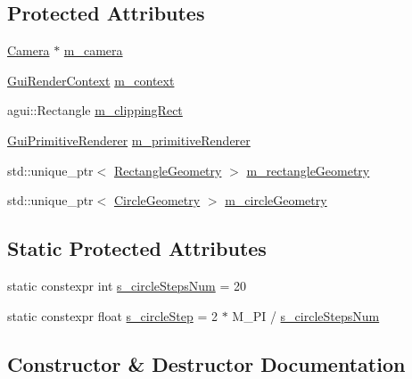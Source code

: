 \subsection*{Protected Attributes}
\begin{DoxyCompactItemize}
\item 
\mbox{\hyperlink{classec_1_1_camera}{Camera}} $\ast$ \mbox{\hyperlink{classec_1_1_open_g_l_graphics_a4d3a8b4a13012197802957a5465c6561}{m\+\_\+camera}}
\item 
\mbox{\hyperlink{structec_1_1_gui_render_context}{Gui\+Render\+Context}} \mbox{\hyperlink{classec_1_1_open_g_l_graphics_ab76d6c71e727a8a5127fae1071afe989}{m\+\_\+context}}
\item 
agui\+::\+Rectangle \mbox{\hyperlink{classec_1_1_open_g_l_graphics_aa45cbffad59139ce5f85404b755cc35f}{m\+\_\+clipping\+Rect}}
\item 
\mbox{\hyperlink{classec_1_1_gui_primitive_renderer}{Gui\+Primitive\+Renderer}} \mbox{\hyperlink{classec_1_1_open_g_l_graphics_af9728fbde00a35a87752c23e009e3864}{m\+\_\+primitive\+Renderer}}
\item 
std\+::unique\+\_\+ptr$<$ \mbox{\hyperlink{classec_1_1_rectangle_geometry}{Rectangle\+Geometry}} $>$ \mbox{\hyperlink{classec_1_1_open_g_l_graphics_a456769068c3eeca19ea08838c25d62a2}{m\+\_\+rectangle\+Geometry}}
\item 
std\+::unique\+\_\+ptr$<$ \mbox{\hyperlink{classec_1_1_circle_geometry}{Circle\+Geometry}} $>$ \mbox{\hyperlink{classec_1_1_open_g_l_graphics_af6668c5422dd67c532ac9719d8ec406c}{m\+\_\+circle\+Geometry}}
\end{DoxyCompactItemize}
\subsection*{Static Protected Attributes}
\begin{DoxyCompactItemize}
\item 
static constexpr int \mbox{\hyperlink{classec_1_1_open_g_l_graphics_a311d856061bbc1ee99d1b2e2c1c524a4}{s\+\_\+circle\+Steps\+Num}} = 20
\item 
static constexpr float \mbox{\hyperlink{classec_1_1_open_g_l_graphics_adba38a812344c43364c208caa70985e0}{s\+\_\+circle\+Step}} = 2 $\ast$ M\+\_\+\+PI / \mbox{\hyperlink{classec_1_1_open_g_l_graphics_a311d856061bbc1ee99d1b2e2c1c524a4}{s\+\_\+circle\+Steps\+Num}}
\end{DoxyCompactItemize}


\subsection{Constructor \& Destructor Documentation}
\mbox{\label{classec_1_1_open_g_l_graphics_a00fc60468c629c36d438a8cbd7515907}} 
